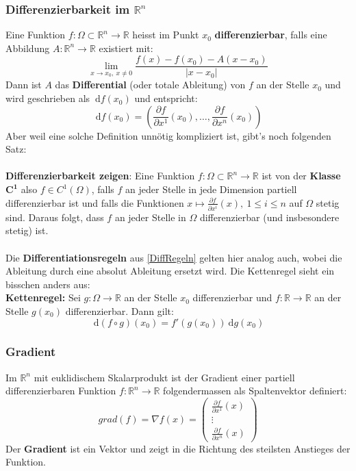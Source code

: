 \documentclass[a4paper,10pt]{scrartcl}
\newcommand{\diff}{\ \mathrm{d}}
\begin{document}
\subsubsection{Differenzierbarkeit im $\mathbb{R}^n$}
Eine Funktion $f:\Omega \subset \mathbb{R}^n\to \mathbb{R}$ heisst im Punkt $x_0$ \textbf{differenzierbar}, falls eine Abbildung $A:\mathbb{R}^n\to \mathbb{R}$ existiert mit: 
\begin{equation}
	\lim\limits_{x\to x_0,\ x\neq 0} \frac{f(x) -f(x_0) - A(x-x_0)}{|x-x_0|}
\end{equation}
Dann ist $A$ das \textbf{Differential} (oder totale Ableitung) von $f$ an der Stelle $x_0$ und wird geschrieben als $\diff f(x_0)$ und entspricht: 
\begin{equation}
	\diff f(x_0) = \left( \frac{\partial f}{\partial x^1}(x_0), \dots , \frac{\partial f}{\partial x^n}(x_0)\right)
\end{equation}
Aber weil eine solche Definition unnötig kompliziert ist, gibt's noch folgenden Satz: \\\\
\textbf{Differenzierbarkeit zeigen}:
Eine Funktion $f:\Omega \subset\mathbb{R}^n\to \mathbb{R}$ ist von der\textbf{ Klasse $\boldsymbol{C^1}$ }also $f\in C^1(\Omega)$, falls $f$ an jeder Stelle in jede Dimension partiell differenzierbar ist und falls die Funktionen $x\mapsto \frac{\partial f}{\partial x^i}(x),\ 1\leq i\leq n$ auf $\Omega$ stetig sind. Daraus folgt, dass $f$ an jeder Stelle in $\Omega$ differenzierbar (und insbesondere stetig) ist. \\\\
Die \textbf{Differentiationsregeln} aus \ref{DiffRegeln} gelten hier analog auch, wobei die Ableitung durch eine absolut Ableitung ersetzt wird. Die Kettenregel sieht ein bisschen anders aus:\\
\textbf{Kettenregel:}  Sei $g:\Omega\to \mathbb{R}$ an der Stelle $x_0$ differenzierbar und $f:\mathbb{R}\to \mathbb{R}$ an der Stelle $g(x_0)$ differenzierbar. Dann gilt: 
\begin{equation}
	\diff (f\circ g)(x_0)=f'(g(x_0))\diff g(x_0)
\end{equation}
\subsubsection{Gradient}
Im $\mathbb{R}^n$ mit euklidischem Skalarprodukt ist der Gradient einer partiell differenzierbaren Funktion $f:\mathbb{R}^n\to \mathbb{R}$ folgendermassen als Spaltenvektor definiert: 
\begin{equation}
	grad(f) = \nabla f(x) = \begin{pmatrix} \frac{\partial f}{\partial x^1}(x)\\ \vdots \\ \frac{\partial f}{\partial x^n}(x) \end{pmatrix}
\end{equation}
Der \textbf{Gradient} ist ein Vektor und zeigt in die Richtung des steilsten Anstieges der Funktion.
\end{document}
